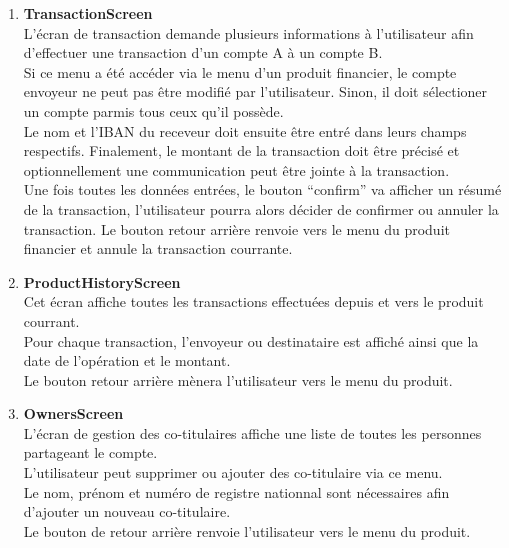\documentclass{article}
\begin{document}
\begin{enumerate}
\item \textbf{TransactionScreen}\\
L'écran de transaction demande plusieurs informations à l'utilisateur afin d'effectuer une transaction d'un compte A à un compte B.\\
Si ce menu a été accéder via le menu d'un produit financier, le compte envoyeur ne peut pas être modifié par l'utilisateur. Sinon, il doit sélectioner un compte parmis tous ceux qu'il possède.\\
Le nom et l'IBAN du receveur doit ensuite être entré dans leurs champs respectifs. Finalement, le montant de la transaction doit être précisé et optionnellement une communication peut être jointe à la transaction.\\
Une fois toutes les données entrées, le bouton ``confirm'' va afficher un résumé de la transaction, l'utilisateur pourra alors décider de confirmer ou annuler la transaction.
Le bouton retour arrière renvoie vers le menu du produit financier et annule la transaction courrante.

\item \textbf{ProductHistoryScreen}\\
Cet écran affiche toutes les transactions effectuées depuis et vers le produit courrant.\\
Pour chaque transaction, l'envoyeur ou destinataire est affiché ainsi que la date de l'opération et le montant.\\
Le bouton retour arrière mènera l'utilisateur vers le menu du produit.

\item \textbf{OwnersScreen}\\
L'écran de gestion des co-titulaires affiche une liste de toutes les personnes partageant le compte.\\
L'utilisateur peut supprimer ou ajouter des co-titulaire via ce menu.\\
Le nom, prénom et numéro de registre nationnal sont nécessaires afin d'ajouter un nouveau co-titulaire.\\
Le bouton de retour arrière renvoie l'utilisateur vers le menu du produit.

\end{enumerate}
\end{document}
